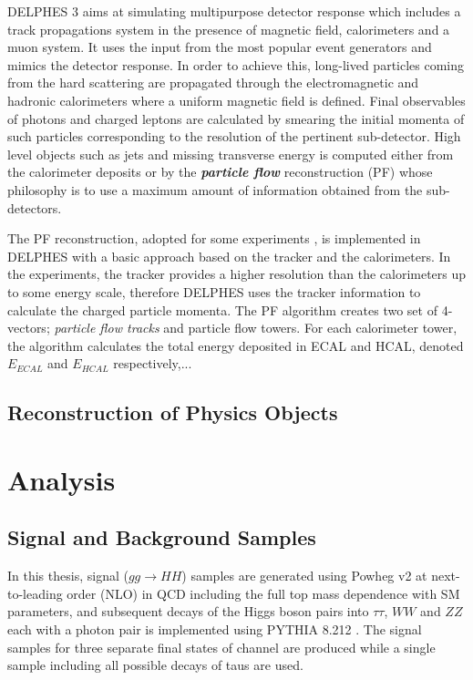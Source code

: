 DELPHES 3 aims at simulating multipurpose detector response which includes a track propagations system in the presence of magnetic field, calorimeters and a muon system. It uses the input from the most popular event generators and mimics the detector response. In order to achieve this, long-lived particles coming from the hard scattering are propagated through the electromagnetic and hadronic calorimeters where a uniform magnetic field is defined. Final observables of photons and charged leptons are calculated by smearing the initial momenta of such particles corresponding to the resolution of the pertinent sub-detector. High level objects such as jets and missing transverse energy is computed either from the calorimeter deposits or by the \emph{\bf{particle flow}} reconstruction (PF) whose philosophy is to use a maximum amount of information obtained from the sub-detectors.

The PF reconstruction, adopted for some experiments \cite{CMS-PAS-PFT-09-001, ALEPH:1994ayc}, is implemented in DELPHES with a basic approach based on the tracker and the calorimeters. In the experiments, the tracker provides a higher resolution than the calorimeters up to some energy scale, therefore DELPHES uses the tracker information to calculate the charged particle momenta. The PF algorithm creates two set of 4-vectors; \emph{particle flow tracks} and {particle flow towers}. For each calorimeter tower, the algorithm calculates the total energy deposited in ECAL and HCAL, denoted $E_{ECAL}$ and $E_{HCAL}$ respectively,...

\subsection{Reconstruction of Physics Objects}



\section{Analysis}

\subsection{Signal and Background Samples}

In this thesis, signal ($gg \rightarrow HH$) samples are generated using Powheg v2 \cite{Nason2004, Frixione2007, Alioli2010, Heinrich2019} at next-to-leading order (NLO) in QCD including the full top mass dependence with SM parameters, and subsequent decays of the Higgs boson pairs into $\tau\tau$, $WW$ and $ZZ$ each with a photon pair is implemented using PYTHIA 8.212 \cite{Sjstrand2015}. The signal samples for three separate final states of \wwgg channel are produced while a single sample including all possible decays of taus are used.


